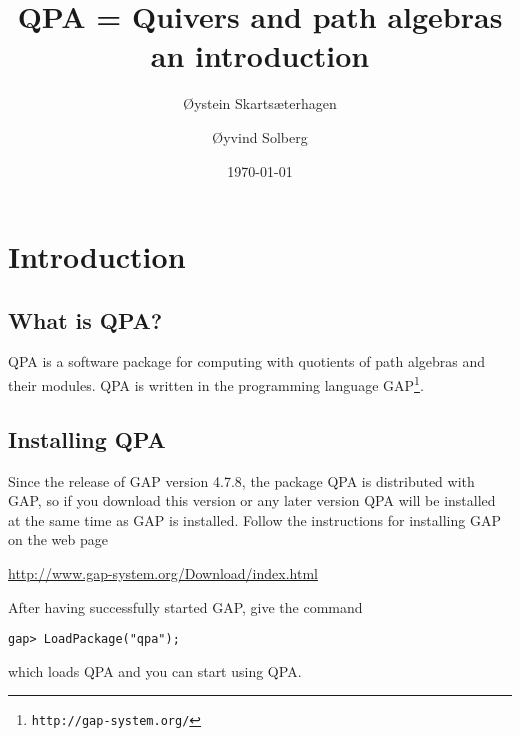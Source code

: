 \documentclass{amsart}
\theoremstyle{definition}
\theoremstyle{theoretic}
\begin{document}
\title[QPA -- an introduction]{QPA = Quivers and path algebras\\an introduction} 

\author[Skarts\ae terhagen]{\O ystein  Skarts\ae terhagen}
\address{\O ystein Skarts\ae terhagen\\
Institutt for matematiske fag\\
NTNU\\ 
N--7491 Trondheim\\ 
Norway}

\author[Solberg]{\O yvind Solberg}
\address{\O yvind Solberg\\
Institutt for matematiske fag\\
NTNU\\ 
N--7491 Trondheim\\ 
Norway}

\date{\today}

\begin{abstract}
\end{abstract}

\maketitle



\section{Introduction}

\subsection{What is QPA?\nopunct}

QPA is a software package for computing with quotients of path
algebras and their modules.  QPA is written in the programming
language GAP\footnote{\texttt{http://gap-system.org/}}.



\subsection{Installing QPA}
Since the release of GAP version 4.7.8, the package QPA is distributed
with GAP, so if you download this version or any later version QPA
will be installed at the same time as GAP is installed.  Follow
the instructions for installing GAP on the web page
\begin{center}
\url{http://www.gap-system.org/Download/index.html}
\end{center}
After having successfully started GAP, give the command
\begin{verbatim}
gap> LoadPackage("qpa");
\end{verbatim}
which loads QPA and you can start using QPA. 
\end{document}
